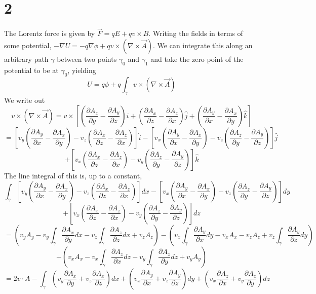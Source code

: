 \documentclass{article}
\begin{document}
\section*{2}
The Lorentz force is given by $\vec{F}=qE+qv\times B$. Writing the fields in terms of some potential,
$-\nabla U=-q\nabla \phi+qv\times(\nabla \times\vec{A})$. We can integrate this along an arbitrary path $\gamma$ between two points $\gamma_0$ and $\gamma_1$ and take the zero point of the potential to be at $\gamma_0$, yielding
\[U=q\phi+q\int_\gamma v\times(\nabla\times \vec{A})\]
We write out
\[v\times(\nabla\times\vec{A})=v\times\left[\left(\frac{\partial A_z}{\partial y}-\frac{\partial A_y}{\partial z}\right)\hat{i}+\left(\frac{\partial A_x}{\partial z}-\frac{\partial A_z}{\partial x}\right)\hat{j}+\left(\frac{\partial A_y}{\partial x}-\frac{\partial A_x}{\partial y}\right)\hat{k}\right]\]
\[=\left[ v_y\left(\frac{\partial A_y}{\partial x}-\frac{\partial A_x}{\partial y} \right)-v_z\left( \frac{\partial A_x}{\partial z}-\frac{\partial A_z}{\partial x} \right)\right]\hat{i}-\left[ v_x\left( \frac{\partial A_y}{\partial x}-\frac{\partial A_x}{\partial y}\right)-v_z\left(\frac{\partial A_z}{\partial y}-\frac{\partial A_y}{\partial z}\right) \right]\hat{j}\]
\[+\left[ v_x\left(  \frac{\partial A_x}{\partial z}-\frac{\partial A_z}{\partial x}\right)-v_y\left(\frac{\partial A_z}{\partial y}-\frac{\partial A_y}{\partial z}  \right) \right]\hat{k}\]
The line integral of this is, up to a constant,
\[\int_\gamma\left[ v_y\left(\frac{\partial A_y}{\partial x}-\frac{\partial A_x}{\partial y} \right)-v_z\left( \frac{\partial A_x}{\partial z}-\frac{\partial A_z}{\partial x} \right)\right]dx-\left[ v_x\left(\frac{\partial A_y}{\partial x}-\frac{\partial A_x}{\partial y}\right)-v_z\left(\frac{\partial A_z}{\partial y}-\frac{\partial A_y}{\partial z}\right) \right]dy\]
\[+\left[ v_x\left(  \frac{\partial A_x}{\partial z}-\frac{\partial A_z}{\partial x}\right)-v_y\left(\frac{\partial A_z}{\partial y}-\frac{\partial A_y}{\partial z}  \right) \right]dz\]
\[=\left( v_yA_y-v_y\int_\gamma \frac{\partial A_x}{\partial y}dx-v_z\int_\gamma\frac{\partial A_z}{\partial z}dx + v_zA_z\right)-\left(v_x\int_\gamma \frac{\partial A_y}{\partial x}dy-v_xA_x-v_zA_z+v_z\int_\gamma\frac{\partial A_y}{\partial z}dy  \right)\]
\[+\left( v_xA_x-v_x\int_\gamma\frac{\partial A_z}{\partial x}dz-v_y\int_\gamma\frac{\partial A_z}{\partial y}dz+v_yA_y\right)\]
\[=2v\cdot A-\int_\gamma \left(v_y\frac{\partial A_x}{\partial y}+v_z\frac{\partial A_x}{\partial z}\right)dx+\left( v_x\frac{\partial A_y}{\partial x}+v_z\frac{\partial A_y}{\partial z} \right)dy+\left( v_x\frac{\partial A_z}{\partial x}+v_y\frac{\partial A_z}{\partial y} \right)dz\]
\end{document}
